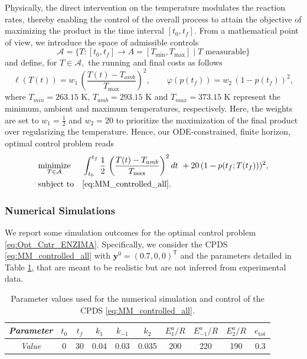 \documentclass[10pt]{article}
\theoremstyle{remark}
\newcommand{\tpose}{^\mathsf{T}}
\theoremstyle{definition}
\theoremstyle{remark}
\begin{document}
Physically, the direct intervention on the temperature modulates the reaction rates, thereby enabling the control of the overall process to attain the objective of maximizing the product in the time interval $[t_0,t_f]$. From a mathematical point of view, we introduce the space of admissible controls 
\begin{equation*}
    \mathcal{A}=\{T : [t_0, t_f] \to A=[T_{\min}, T_{\max}] \; |\; T \text{ measurable} \}
\end{equation*}
and define, for $T\in \mathcal{A},$ the running and final costs as follows
\begin{equation*}
    \ell(T(t))= w_{1}\, \left( \frac{T(t)-T_{amb}}{T_{\max}} \right)^2, \qquad \varphi(p(t_f))= w_{2}\, (1-p(t_f))^2,
\end{equation*}
where $T_{min}=263.15$ K, $T_{amb}=293.15$ K and $T_{max}=373.15$ K represent the minimum, ambient and maximum temperatures, respectively. Here, the weights are set to $w_1=\frac12$ and $w_2=20$ to prioritize the maximization of the final product over regularizing the temperature.
Hence, our ODE-constrained, finite horizon, optimal control problem reads
\begin{equation}\label{eq:Opt_Cntr_ENZIMA}
    \begin{aligned}
    & \underset{T\in \mathcal{A}}{\text{minimize}}
    & & \int_{t_0}^{t_f} \frac{1}{2}\, \left( \frac{T(t)-T_{amb}}{T_{\max}} \right)^2  dt \ + 20\, (1-p(t_f;T(t_f)))^2, \\
    & \text{subject to} 
    & & \eqref{eq:MM_controlled_all}.
    \end{aligned}
\end{equation}
\subsubsection{Numerical Simulations}
We report some simulation outcomes for the optimal control problem \eqref{eq:Opt_Cntr_ENZIMA}. Specifically, we consider the CPDS \eqref{eq:MM_controlled_all} with $\bm{y}^0=(0.7,0,0)\tpose$ and the parameters detailed in Table \ref{tab:enzyme}, that are meant to be realistic but are not inferred from experimental data.
\begin{table}[H]
    \centering
    \begin{tabular}{|c|c|c|c|c|c|c|c|c|c|}
        \hline
        \textit{Parameter} & $t_0$ & $t_f$ & $k_1$ & $k_{-1}$ & $k_2$ & $E_1^a / R$ & $E_{-1}^a / R$ & $E_2^a / R$ & $e_{\text{tot}}$ \\
        \hline
        \textit{Value} & 0 & 30 & 0.04 & 0.03 & 0.035 & 200 & 220 & 190 & 0.3 \\
        \hline
    \end{tabular}
    \caption{Parameter values used for the numerical simulation and control of the CPDS \eqref{eq:MM_controlled_all}.}
    \label{tab:enzyme}
\end{table}
\end{document}
